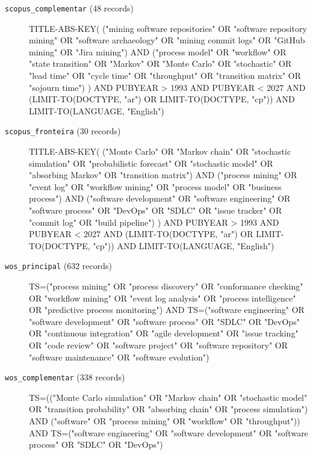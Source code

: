 \begin{description}
\item[\texttt{scopus\_complementar} (48 records)]{\footnotesize\ttfamily\raggedright
TITLE-ABS-KEY( ("mining software repositories" OR "software repository mining" OR "software archaeology" OR "mining commit logs" OR "GitHub mining" OR "Jira mining") AND ("process model" OR "workflow" OR "state transition" OR "Markov" OR "Monte Carlo" OR "stochastic" OR "lead time" OR "cycle time" OR "throughput" OR "transition matrix" OR "sojourn time") ) AND PUBYEAR > 1993 AND PUBYEAR < 2027 AND (LIMIT-TO(DOCTYPE, "ar") OR LIMIT-TO(DOCTYPE, "cp")) AND LIMIT-TO(LANGUAGE, "English")\par}

\item[\texttt{scopus\_fronteira} (30 records)]{\footnotesize\ttfamily\raggedright
TITLE-ABS-KEY( ("Monte Carlo" OR "Markov chain" OR "stochastic simulation" OR "probabilistic forecast" OR "stochastic model" OR "absorbing Markov" OR "transition matrix") AND ("process mining" OR "event log" OR "workflow mining" OR "process model" OR "business process") AND ("software development" OR "software engineering" OR "software process" OR "DevOps" OR "SDLC" OR "issue tracker" OR "commit log" OR "build pipeline") ) AND PUBYEAR > 1993 AND PUBYEAR < 2027 AND (LIMIT-TO(DOCTYPE, "ar") OR LIMIT-TO(DOCTYPE, "cp")) AND LIMIT-TO(LANGUAGE, "English")\par}

\item[\texttt{wos\_principal} (632 records)]{\footnotesize\ttfamily\raggedright
TS=("process mining" OR "process discovery" OR "conformance checking" OR "workflow mining" OR "event log analysis" OR "process intelligence" OR "predictive process monitoring") AND TS=("software engineering" OR "software development" OR "software process" OR "SDLC" OR "DevOps" OR "continuous integration" OR "agile development" OR "issue tracking" OR "code review" OR "software project" OR "software repository" OR "software maintenance" OR "software evolution")\par}

\item[\texttt{wos\_complementar} (338 records)]{\footnotesize\ttfamily\raggedright
TS=(("Monte Carlo simulation" OR "Markov chain" OR "stochastic model" OR "transition probability" OR "absorbing chain" OR "process simulation") AND ("software" OR "process mining" OR "workflow" OR "throughput")) AND TS=("software engineering" OR "software development" OR "software process" OR "SDLC" OR "DevOps")\par}


\end{description}
